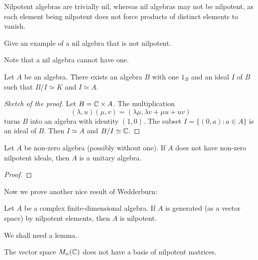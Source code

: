 Nilpotent algebras are trivially nil, whereas nil algebras may not be nilpotent, as each element being nilpotent does not force products of distinct elements to vanish.

\begin{exercise}
    Give an example of a nil algebra that is not nilpotent. 
\end{exercise}

Note that a nil algebra cannot have one. 


\begin{proposition}
    Let $A$ be an algebra. There exists an algebra $B$ 
    with one $1_B$ and an ideal $I$ of $B$ 
    such that $B/I\simeq K$ and $I\simeq A$. 
\end{proposition}

\begin{proof}[Sketch of the proof]
    Let $B=\mathbb{C}\times A$. The multiplication  
    \[
    (\lambda,u)(\mu,v)=(\lambda\mu,\lambda v+\mu u+uv)
    \]
    turns $B$ into an algebra with identity $(1,0)$. The subset
    $I=\{(0,a):a\in A\}$ is an ideal of $B$. Then $I\simeq A$ 
    and $B/I\simeq\mathbb{C}$. 
\end{proof}

\begin{proposition}
    Let $A$ be non-zero algebra (possibly without one). If $A$ 
    does not have non-zero nilpotent ideals, 
    then $A$ is a unitary algebra. 
\end{proposition}

\begin{proof}

\end{proof}

Now we prove another nice result of Wedderburn:

\begin{theorem}[Wedderburn]
\label{thm:Wedderburn}
    Let $A$ be a complex finite-dimensional 
    algebra. If $A$ is generated (as a vector space) 
    by nilpotent elements, then $A$ is nilpotent. 
\end{theorem}

We shall need a lemma.

\begin{lemma}
    The vector space $M_n(\mathbb{C})$ does not have a basis of nilpotent matrices. 
\end{lemma}

